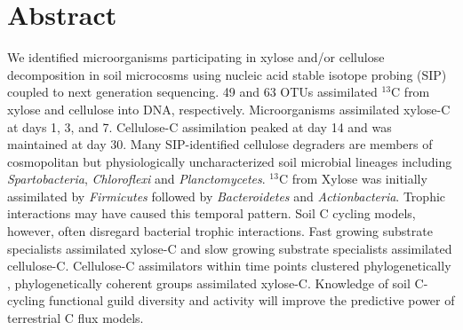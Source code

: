 \section{Abstract} We identified microorganisms participating in xylose and/or
cellulose decomposition in soil microcosms using nucleic acid stable isotope
probing (SIP) coupled to next generation sequencing. 49 and 63
OTUs assimilated $^{13}$C from xylose and cellulose into DNA, respectively.
Microorganisms assimilated xylose-C at days 1, 3, and 7. Cellulose-C
assimilation peaked at day 14 and was maintained at day 30. Many SIP-identified
cellulose degraders are members of cosmopolitan but physiologically
uncharacterized soil microbial lineages including \textit{Spartobacteria},
\textit{Chloroflexi} and \textit{Planctomycetes}. $^{13}$C from Xylose was
initially assimilated by \textit{Firmicutes} followed by \textit{Bacteroidetes}
and \textit{Actionbacteria}. Trophic interactions may have caused this temporal
pattern. Soil C cycling models, however, often disregard bacterial trophic
interactions. Fast growing substrate specialists assimilated xylose-C and slow
growing substrate specialists assimilated cellulose-C. Cellulose-C assimilators
within time points clustered phylogenetically , phylogenetically coherent
groups assimilated xylose-C. Knowledge of soil C-cycling functional guild
diversity and activity will improve the predictive power of terrestrial C flux
models. 
